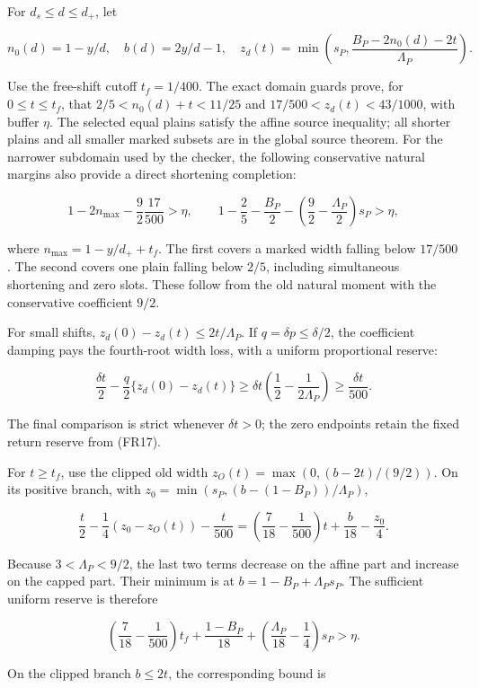 For \(d_s\le d\le d_+\), let

\[
n_0(d)=1-y/d,\quad b(d)=2y/d-1,\quad
z_d(t)=\min\left(s_P,\frac{B_P-2n_0(d)-2t}{\Lambda_P}\right).
\tag{FR18}
\]

Use the free-shift cutoff \(t_f=1/400\). The exact domain guards prove, for \(0\le t\le t_f\), that \(2/5<n_0(d)+t<11/25\) and \(17/500<z_d(t)<43/1000\), with buffer \(\eta\). The selected equal plains satisfy the affine source inequality; all shorter plains and all smaller marked subsets are in the global source theorem. For the narrower subdomain used by the checker, the following conservative natural margins also provide a direct shortening completion:

\[
1-2n_{\max}-\frac92\frac{17}{500}>\eta,
\qquad
1-\frac25-\frac{B_P}{2}
 -\left(\frac92-\frac{\Lambda_P}{2}\right)s_P>\eta,
\tag{FR19}
\]

where \(n_{\max}=1-y/d_++t_f\). The first covers a marked width falling below \(17/500\). The second covers one plain falling below \(2/5\), including simultaneous shortening and zero slots. These follow from the old natural moment with the conservative coefficient \(9/2\).

For small shifts, \(z_d(0)-z_d(t)\le2t/\Lambda_P\). If \(q=\delta p\le\delta/2\), the coefficient damping pays the fourth-root width loss, with a uniform proportional reserve:

\[
\frac{\delta t}{2}-\frac q2\{z_d(0)-z_d(t)\}
\ge\delta t\left(\frac12-\frac1{2\Lambda_P}\right)
\ge\frac{\delta t}{500}.
\tag{FR20}
\]

The final comparison is strict whenever \(\delta t>0\); the zero endpoints retain the fixed return reserve from (FR17).

For \(t\ge t_f\), use the clipped old width \(z_O(t)=\max(0,(b-2t)/(9/2))\). On its positive branch, with \(z_0=\min(s_P,(b-(1-B_P))/\Lambda_P)\),

\[
\frac t2-\frac14(z_0-z_O(t))-\frac{t}{500}
=\left(\frac7{18}-\frac1{500}\right)t+\frac b{18}-\frac{z_0}{4}.
\]

Because \(3<\Lambda_P<9/2\), the last two terms decrease on the affine part and increase on the capped part. Their minimum is at \(b=1-B_P+\Lambda_Ps_P\). The sufficient uniform reserve is therefore

\[
\left(\frac7{18}-\frac1{500}\right)t_f
 +\frac{1-B_P}{18}
 +\left(\frac{\Lambda_P}{18}-\frac14\right)s_P>\eta.
\tag{FR21}
\]

On the clipped branch \(b\le2t\), the corresponding bound is

